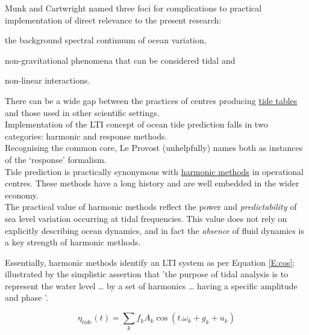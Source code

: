 Munk and Cartwright \citep{Munk:1966ts} named three foci for complications to practical implementation of direct relevance to the present research:
\begin{compactitem}
\item the background spectral continuum of ocean variation, 
\item non-gravitational phenomena that can be considered tidal and 
\item non-linear interactions.   
\end{compactitem}




There can be a wide gap between the practices of centres producing \underline{tide tables} and those used in other scientific settings.\\


Implementation of the LTI concept of ocean tide prediction falls in two categories: harmonic and response methods. \\
Recognising the common core, Le Provost \citep[chpt6]{Fu:2001ub} (unhelpfully) names both as instances of the `response' formalism. \\



Tide prediction is practically synonymous with \underline{harmonic methods} in operational centres.  These methods have a long history \citep{Cartwright:2000tt}\citep{Parker:2007wq} and are well embedded in the wider economy.\\
The practical value of harmonic methods reflect the power and \emph{predictability} of sea level variation occurring at tidal frequencies.  This value does not rely on explicitly describing ocean dynamics, and in fact the \emph{absence} of fluid dynamics is a key strength of harmonic methods.   


Essentially, harmonic methods identify an LTI system as per Equation \ref{E:cos}; illustrated by the simplistic assertion that 'the purpose of tidal analysis is to represent the water level \dots{} by a set of harmonics \dots{} having a specific amplitude and phase '\citep{PCTMSL:2009vy}.

\begin{equation}
\label{E:cos}
\eta_{tide}(t) = \sum_{k} f_k A_k \cos ( t.\omega_k + g_k + u_k)
\end{equation}

